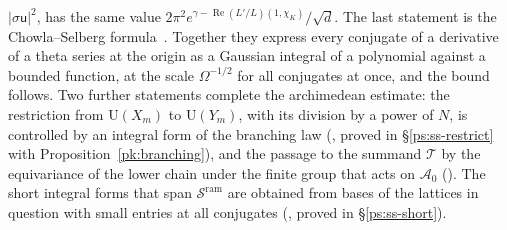 \documentclass[10pt]{amsart}
\theoremstyle{definition}
\theoremstyle{remark}
\newcommand{\Rel}{\operatorname{Re}}
\providecommand{\auAz}{\mathcal A_0}
\providecommand{\auSram}{\mathcal S^{\mathrm{ram}}}
\providecommand{\auT}{\mathcal T}
\providecommand{\auU}{\mathrm U}
\providecommand{\auchi}{\chi_K}
\begin{document}
$|\sigma\mathsf u|^2$, has the same value $2\pi^2e^{\gamma-\Rel(L'/L)(1,\auchi)}/\sqrt d$. The
last statement is the Chowla--Selberg formula~\cite{ChowlaSelberg}. Together they express every
conjugate of a derivative of a theta series at the origin as a Gaussian integral of a polynomial against
a bounded function, at the scale $\Omega^{-1/2}$ for all conjugates at once, and the bound
follows. Two further statements complete the archimedean estimate: the restriction from
$\auU(X_m)$ to $\auU(Y_m)$, with its division by a power of $N$, is controlled by an integral
form of the branching law ({\cite[Proposition~14.24]{P46}}, proved in \S\ref{ps:ss-restrict} with
Proposition~\ref{pk:branching}), and the passage to the summand $\auT$ by the equivariance of the
lower chain under the finite group that acts on $\auAz$ ({\cite[Proposition~14.27]{P46}}). The short
integral forms that span $\auSram$ are obtained from bases of the lattices in question with small
entries at all conjugates ({\cite[Lemma~14.21]{P46}}, proved in \S\ref{ps:ss-short}).
\end{document}
